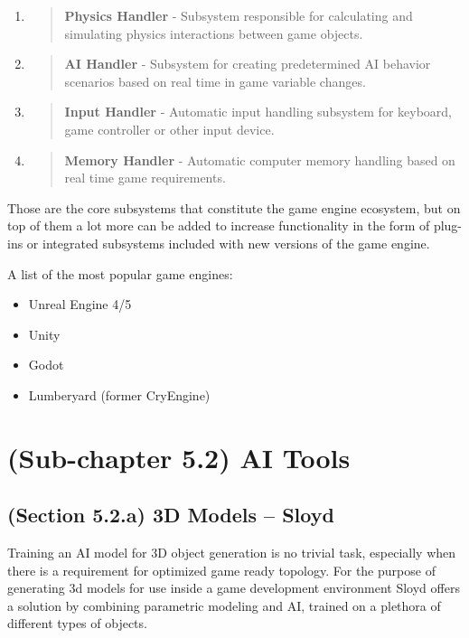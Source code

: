 \documentclass[a4paper,one side,12pt]{book}
\begin{document}
\begin{enumerate}
\begin{quote}
  \textbf{Audio Handler} - Subsystem for handling all audio being played
  in game.
  \end{quote}
\item
  \begin{quote}
  \textbf{Physics Handler} - Subsystem responsible for calculating and
  simulating physics interactions between game objects.
  \end{quote}
\item
  \begin{quote}
  \textbf{AI Handler} - Subsystem for creating predetermined AI
  behavior scenarios based on real time in game variable changes.
  \end{quote}
\item
  \begin{quote}
  \textbf{Input Handler} - Automatic input handling subsystem for
  keyboard, game controller or other input device.
  \end{quote}
\item
  \begin{quote}
  \textbf{Memory Handler} - Automatic computer memory handling based on
  real time game requirements.
  \end{quote}
\end{enumerate}

Those are the core subsystems that constitute the game engine ecosystem,
but on top of them a lot more can be added to increase functionality in
the form of plug-ins or integrated subsystems included with new versions
of the game engine.

A list of the most popular game engines:

\begin{itemize}
\item
  Unreal Engine 4/5
\item
  Unity
\item
  Godot
\item
  Lumberyard (former CryEngine)
\end{itemize}


\section{(Sub-chapter 5.2) AI Tools}


\subsection{(Section 5.2.a) 3D Models -- Sloyd}

Training an AI model for 3D object generation is no trivial task, especially when there is a requirement for optimized game ready topology. 
For the purpose of generating 3d models for use inside a game development
environment Sloyd\cite{sloyd} offers a solution by combining parametric modeling and AI, trained on a plethora of
different types of objects.
\end{document}
